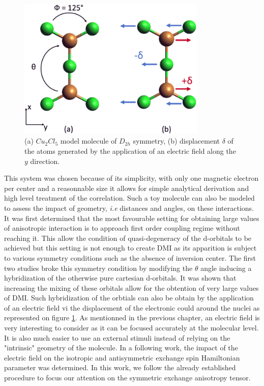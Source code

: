 \documentclass[10pt]{report}
\numberwithin{equation}{section}
\begin{document}
\begin{figure}[h!]
    \centering
    \includegraphics[width=0.8\textwidth]{Images/Cu2Cl5.png}
    \caption{(a) $Cu_2Cl_5$ model molecule of $D_{2h}$ symmetry, (b) displacement $\delta$ of the atoms generated by the application of an electric field along the $y$ direction.}
    \label{MolCu2Cl5}
\end{figure}


This system was chosen because of its simplicity, with only one magnetic electron per center and a reasonnable size it allows for simple analytical derivation and high level treatment of the correlation.
Such a toy molecule can also be modeled to assess the impact of geometry, \textit{i.e} distances and angles, on these interactions.
It was first determined that the most favourable setting for obtaining large values of anisotropic interaction is to approach first order coupling regime without reaching it.
This allow the condition of quasi-degeneracy of the d-orbitals to be achieved but this setting is not enough to create DMI as its apparition is subject to various symmetry conditions such as the absence of inversion center.
The first two studies broke this symmetry condition by modifying the $\theta$ angle inducing a hybridization of the otherwise pure cartesian d-orbitals.
It was shown that increasing the mixing of these orbitals allow for the obtention of very large values of DMI.
Such hybridization of the orbtials can also be obtain by the application of an electric field vi the displacement of the electronic could around the nuclei as represented on figure \ref{MolCu2Cl5}.
As mentionned in the previous chapter, an electric field is very interesting to consider as it can be focused accurately at the molecular level. 
It is also much easier to use an external stimuli instead of relying on the "intrinsic" geometry of the molecule.
In a following work, the impact of the electric field on the isotropic and antisymmetric exchange spin Hamiltonian parameter was determined.
In this work, we follow the already established procedure to focus our attention on the symmetric exchange anisotropy tensor.
\end{document}
